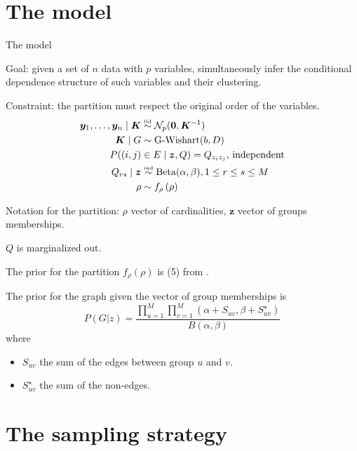 
\section{The model}

\begin{frame}{The model}

\alert{Goal}: given a set of $n$ data with $p$ variables, simultaneously infer the conditional dependence structure of such variables and their clustering.

\pause

\alert{Constraint}: the partition must respect the original order of the variables.
\pause
\begin{align*}
    \bm{y}_1, \ldots, \bm{y}_n \mid \bm{K} & \overset{\text{\tiny{iid}}}{\sim} \mathcal{N}_p(\mathbf{0}, \bm{K}^{-1} ) \\
    \bm{K} \mid G & \sim \operatorname{G-Wishart}(b, D)\\
    P((i,j)&\in E\mid \bm{z},Q) = Q_{z_{i} z_{j}},\,\text{independent}\\
        Q_{rs} \mid \bm{z} &\overset{\text{\tiny{ind}}}{\sim} \operatorname{Beta}(\alpha,\beta), 1\leq r\leq s\leq M\\
    \rho & \sim f_{\rho} \left(\rho\right)
\end{align*}

Notation for the partition: $\rho$ vector of cardinalities, $\bm{z}$ vector of groups memberships.

\end{frame}

\begin{frame}

$Q$ is marginalized out.

\pause


The prior for the \alert{partition} $f_{\rho}(\rho)$ is (5) from \cite{martinezNonparametricChangePoint2014}.

The prior for the \alert{graph} given the vector of group memberships is
$$P(G|z)= \frac {\prod_{u=1}^{M}\prod_{v=1}^{M}(\alpha + S_{uv}, \beta+ S^{\star}_{uv})}{B(\alpha,\beta)}$$
where 
\begin{itemize}
    \item $S_{uv}$ the sum of the edges between group $u$ and $v$.
    \item $S^{\star}_{uv}$ the sum of the non-edges.
\end{itemize}
\pause


\end{frame}

\section{The sampling strategy}

